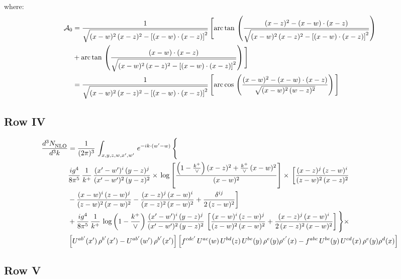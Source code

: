 \documentclass[9pt]{article}
\numberwithin{equation}{section}
\begin{document}
where: \begin{align}
\mathcal{A}_{0} & = \frac{1}{\sqrt{(x-w)^{2}\,(x-z)^{2}-\left[(x-w)\cdot (x-z)\right]^{2}}}\, \Bigg[\mathrm{arc\,tan}\,\left(\frac{(x-z)^{2}-(x-w)\cdot (x-z)}{\sqrt{(x-w)^{2}\,(x-z)^{2}-\left[(x-w)\cdot (x-z)\right]^{2}}}\right)\notag \\ & + \mathrm{arc\,tan}\,\left(\frac{(x-w)\cdot (x-z)}{\sqrt{(x-w)^{2}\,(x-z)^{2}-\left[(x-w)\cdot (x-z)\right]^{2}}}\right) \Bigg]\notag \\ & = \frac{1}{\sqrt{(x-w)^{2}\,(x-z)^{2}-\left[(x-w)\cdot (x-z)\right]^{2}}}\, \Bigg[\mathrm{arc\,cos}\,\left(\frac{(x-w)^{2}-(x-w)\cdot (x-z)}{\sqrt{(x-w)^{2}\,(w-z)^{2}}}\right)\Bigg]
\end{align}
\subsection{Row IV}
\begin{align}
    \frac{d^{3}N_{\rm NLO}^{\rm}}{d^{3}k}  & =   \frac{1}{(2\pi)^{3}}\,
    \int_{x,y,z,w,x',w'}\,e^{-ik\cdot (w^\prime-w)}\,\Bigg\{\notag \\
& \frac{ig^{4}}{8\pi^{5}}\,\frac{1}{k^{+}}\,\frac{(x'-w')^{i}\,(y-z)^{j}}{(x'-w')^{2}\,(y-z)^{2}}\times\,\log{\left[\frac{\left(1-\frac{k^{+}}{\vee}\right)(x-z)^{2}+\frac{k^{+}}{\vee}\,(x-w)^{2}}{(x-w)^{2}}\right]}\times\, \bigg[\frac{(x-z)^{j}\,(z-w)^{i}}{(z-w)^{2}\,(x-z)^{2}}\notag \\ & -\frac{(x-w)^{i}\,(z-w)^{j}}{(z-w)^{2}\,(x-w)^{2}}-\frac{(x-z)^{j}\,(x-w)^{i}}{(x-z)^{2}\,(x-w)^{2}}+\frac{\delta^{ij}}{2\,(z-w)^{2}}\bigg] \notag \\
& + \frac{ig^{4}}{8\pi^{5}}\,\frac{1}{k^{+}}\,\log{\left(1-\frac{k^{+}}{\vee}\right)}\,\frac{(x'-w')^{i}\,(y-z)^{j}}{(x'-w')^{2}\,(y-z)^{2}}\,\left[\frac{(x-w)^{i}\,(z-w)^{j}}{(z-w)^{2}\,(x-w)^{2}}+\frac{(x-z)^{j}\,(x-w)^{i}}{2\, (x-z)^{2}\,(x-w)^{2}}\right]\Bigg\}\times\notag \\ &  \left[U^{ab'}(x')\,\rho^{b'}(x')-U^{ab'}(w')\,\rho^{b'}(x')\right] \left[f^{cdc'}\,U^{ac}(w)\,U^{bd}(z)\,U^{be}(y)\,\rho^{e}(y)\rho^{c'}(x)-f^{abc}\,U^{be}(y)\,U^{cd}(x)\,\rho^{e}(y)\rho^{d}(x)\right]
\end{align}
\subsection{Row V}
\end{document}
